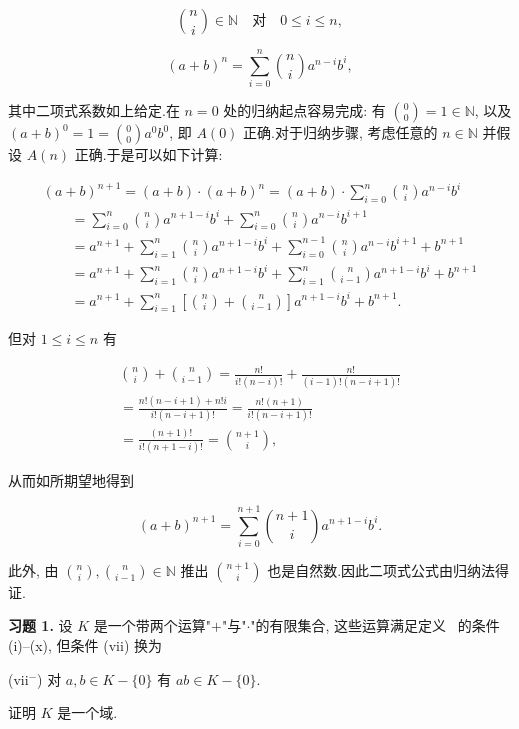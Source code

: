 \[
\binom{n}{i} \in \mathbb{N} \quad \text{对} \quad 0 \leq i \leq n,
\]

\[
(a + b)^n = \sum_{i = 0}^{n} \binom{n}{i} a^{n - i} b^{i},
\]

其中二项式系数如上给定.在 $n = 0$ 处的归纳起点容易完成: 有 $\binom{0}{0} = 1 \in \mathbb{N}$, 以及 $(a + b)^0 = 1 = \binom{0}{0} a^0 b^0$, 即 $A(0)$ 正确.对于归纳步骤, 考虑任意的 $n \in \mathbb{N}$ 并假设 $A(n)$ 正确.于是可以如下计算:

\[
\begin{array}{l}
(a + b)^{n + 1} = (a + b) \cdot (a + b)^n = (a + b) \cdot \sum_{i = 0}^{n} \binom{n}{i} a^{n - i} b^{i} \\
\qquad = \sum_{i = 0}^{n} \binom{n}{i} a^{n + 1 - i} b^{i} + \sum_{i = 0}^{n} \binom{n}{i} a^{n - i} b^{i + 1} \\
\qquad = a^{n + 1} + \sum_{i = 1}^{n} \binom{n}{i} a^{n + 1 - i} b^{i} + \sum_{i = 0}^{n - 1} \binom{n}{i} a^{n - i} b^{i + 1} + b^{n + 1} \\
\qquad = a^{n + 1} + \sum_{i = 1}^{n} \binom{n}{i} a^{n + 1 - i} b^{i} + \sum_{i = 1}^{n} \binom{n}{i - 1} a^{n + 1 - i} b^{i} + b^{n + 1} \\
\qquad = a^{n + 1} + \sum_{i = 1}^{n} \left[\binom{n}{i} + \binom{n}{i - 1}\right] a^{n + 1 - i} b^{i} + b^{n + 1}.
\end{array}
\]

但对 $1 \leq i \leq n$ 有

\[
\begin{array}{c}
\binom{n}{i} + \binom{n}{i - 1} = \frac{n!}{i!(n - i)!} + \frac{n!}{(i - 1)!(n - i + 1)!} \\
= \frac{n!(n - i + 1) + n!i}{i!(n - i + 1)!} = \frac{n!(n + 1)}{i!(n - i + 1)!} \\
= \frac{(n + 1)!}{i!(n + 1 - i)!} = \binom{n + 1}{i},
\end{array}
\]

从而如所期望地得到

\[
(a + b)^{n + 1} = \sum_{i = 0}^{n + 1} \binom{n + 1}{i} a^{n + 1 - i} b^{i}\text{.}
\]

此外, 由 $\binom{n}{i}, \binom{n}{i - 1} \in \mathbb{N}$ 推出 $\binom{n + 1}{i}$ 也是自然数.因此二项式公式由归纳法得证.

\aufgaben

\noindent\textbf{习题 1.} 设 $K$ 是一个带两个运算"$+$"与"$\cdot$"的有限集合, 这些运算满足定义~ 的条件 (i)--(x), 但条件 (vii) 换为
\begin{center}
(vii$^-$) 对 $a, b \in K - \{0\}$ 有 $ab \in K - \{0\}$.
\end{center}
证明 $K$ 是一个域.

